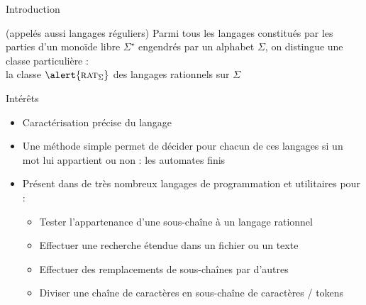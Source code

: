 
\begingroup

\begin{frame}{Introduction}
\begin{block}{ (appelés aussi langages réguliers)}
  Parmi tous les langages constitués par les parties d'un
monoïde libre $\Sigma^\star$ engendrés par un alphabet $\Sigma$,
on distingue une classe particulière : \\
la classe $\alert{\textsc{rat}_\Sigma}$ des langages rationnels sur $\Sigma$
\end{block}
\begin{block}{Intérêts} 
\begin{itemize}
\item Caractérisation précise du langage
\item Une méthode simple permet de décider pour chacun de ces langages si un mot lui appartient ou non : les automates finis
\item Présent dans de très nombreux langages de programmation et utilitaires pour :
 \begin{itemize}
   \item Tester l'appartenance d'une sous-chaîne à un langage rationnel
   \item Effectuer une recherche étendue dans un fichier ou un texte
   \item Effectuer des remplacements de sous-chaînes par d'autres 
   \item Diviser une chaîne de caractères en sous-chaîne de caractères / \alert{tokens}
 \end{itemize}
\end{itemize}
\end{block}
\end{frame}

\endgroup
